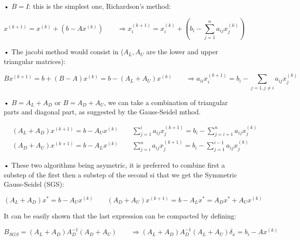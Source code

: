 \begin{itemize}
\item[•] $B=I$: this is the simplest one, Richardson's method: 

\begin{equation}
x^{(k+1)} =  x^{(k)} + (b-Ax^{(k)}) \qquad \Rightarrow x^{(k+1)}_i =  x^{(k)}_i + (b_i-\sum _{j=1}^n a_{ij} x_j^{(k)})
\end{equation}

\item[•] The jacobi method would consist in ($A_L,A_U$ are the lower and upper triangular matrices): 

\begin{equation}
Bx^{(k+1)} =  b + (B-A)x^{(k)} = b - (A_L+A_U)x^{(k)}  \qquad \Rightarrow a_{ii} x_i^{(k+1)} = b_i - \sum _{j=1,j\neq i}a_{ij}x_j^{(k)}
\end{equation}

\item[•] $B = A_L + A_D$ or $B = A_D + A_U$, we can take a combination of triangular parts and diagonal part, as suggested by the Gauss-Seidel mthod.

\begin{equation}
\begin{aligned}
&(A_L + A_D)x^{(k+1)} = b - A_U x^{(k)} \qquad \sum_{j=1}^i a_{ij}x_j^{(k+1)} = b_i - \sum _{j=i+1}^n a_{ij}x_j^{(k)}\\
&(A_D + A_U)x^{(k+1)} = b - A_L x^{(k)} \qquad \sum_{j=i}^n a_{ij}x_j^{(k+1)} = b_i - \sum _{j=1}^{i-1} a_{ij}x_j^{(k)} 
\end{aligned}
\end{equation}

\item[•] These two algorithms being asymetric, it is preferred to combine first a substep of the first then a substep of the second si that we get the Symmetric Gauss-Seidel (SGS): 

\begin{equation}
(A_L + A_D)x^* = b - A_U x^{(k)} \qquad (A_D + A_U)x^{(k+1)} = b - A_L x^* = A_D x^* + A_U x^{(k)}
\end{equation}

It can be easily shown that the last expression can be compacted by defining:

\begin{equation}
B_{SGS} = (A_L + A_D) A_D^{-1}(A_D + A_U)\qquad \Rightarrow
(A_L + A_D) A^{-1}_D (A_L+A_U)\delta _x = b_i - Ax^{(k)} 
\end{equation}


\end{itemize}
